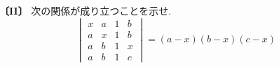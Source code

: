 \noindent\textbf{〔II〕}
次の関係が成り立つことを示せ.
\[
\begin{vmatrix}
x & a & 1 & b\\
a & x & 1 & b\\
a & b & 1 & x\\
a & b & 1 & c
\end{vmatrix}
=(a-x)(b-x)(c-x)
\]
